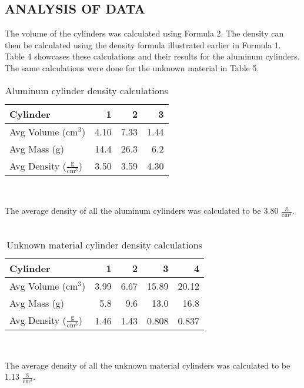 \documentclass [12pt, letterpaper, twoside] {article}
\begin{document}
\subsection* {ANALYSIS OF DATA}
  The volume of the cylinders was calculated using Formula 2. The density can then be calculated using the density formula illustrated earlier in Formula 1. Table 4 showcases these calculations and their results for the aluminum cylinders. The same calculations were done for the unknown material in Table 5. 

\begin {table}[H]
  \centering
  \begin {tabular}{| l | r | r | r |}
    \hline\hline
    Cylinder & 1 & 2 & 3 \\
    \hline
    Avg Volume (\(\text{cm}^3\)) & 4.10 & 7.33 & 1.44 \\
    \hline
    Avg Mass (g) & 14.4 & 26.3 & 6.2 \\
    \hline
    Avg Density (\(\tfrac{\text{g}}{\text{cm}^3}\)) & 3.50 & 3.59 & 4.30 \\
    \hline\hline
  \end {tabular} \\
  \caption {Aluminum cylinder density calculations}
\end {table}

The average density of all the aluminum cylinders was calculated to be 3.80 \(\tfrac{\text{g}}{\text{cm}^3}\). \\\\

\begin {table}[H]
  \centering
  \begin {tabular}{| l | r | r | r | r |}
    \hline\hline
    Cylinder & 1 & 2 & 3 & 4 \\
    \hline
    Avg Volume (\(\text{cm}^3\)) & 3.99 & 6.67 & 15.89 & 20.12 \\
    \hline
    Avg Mass (g) & 5.8 & 9.6 & 13.0 & 16.8 \\
    \hline
    Avg Density (\(\tfrac{\text{g}}{\text{cm}^3}\)) & 1.46 & 1.43 & 0.808 & 0.837 \\
    \hline\hline
  \end {tabular} \\
  \caption {Unknown material cylinder density calculations}
\end {table}

The average density of all the unknown material cylinders was calculated to be 1.13 \(\tfrac{\text{g}}{\text{cm}^3}\).\\\\
\end{document}
